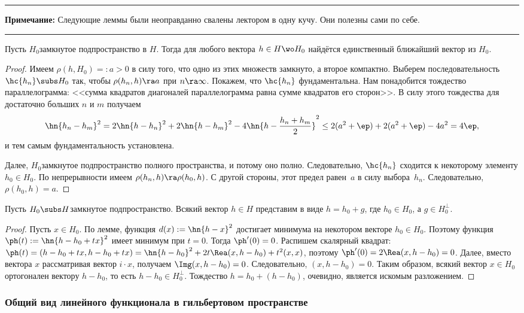 \documentclass[a4paper]{article}
\newcommand{\comment}[1]{\par\vskip2pt\hrule\vskip2pt{\footnotesize \textbf{Примечание:} #1\par}\vskip2pt\hrule\vskip2pt}
\begin{document}
\comment{Следующие леммы были неоправданно свалены лектором в одну кучу. Они полезны сами по себе.}

\begin{lemma}
Пусть $H_0$\т замкнутое подпространство в $H$. Тогда для любого вектора $h \in H \wo H_0$ найдётся единственный
ближайший вектор из $H_0$.
\end{lemma}
\begin{proof}
Имеем $\rho(h, H_0) =: a > 0$ в силу того, что одно из этих множеств замкнуто, а второе компактно.
Выберем последовательность $\hc{h_n} \subs H_0$ так, чтобы $\rho(h_n,h) \ra a$ при $n \ra \infty$.
Покажем, что $\hc{h_n}$ фундаментальна.
Нам понадобится тождество параллелограмма: <<сумма квадратов диагоналей параллелограмма равна
сумме квадратов его сторон>>. В силу этого тождества для достаточно больших $n$ и $m$ получаем
$$\hn{h_n - h_m}^2 = 2\hn{h-h_n}^2 + 2\hn{h-h_m}^2 - 4\hn{h - \frac{h_n+h_m}{2}}^2 \le
2(a^2 + \ep) + 2(a^2 + \ep) - 4a^2 = 4\ep,$$
и тем самым фундаментальность установлена.

Далее, $H_0$\т замкнутое подпространство полного пространства, и потому оно полно.
Следовательно, $\hc{h_n}$ сходится к некоторому элементу $h_0 \in H_0$.
По непрерывности имеем $\rho(h_n,h) \ra \rho(h_0,h)$. С другой стороны, этот предел равен~$a$
в силу выбора~$h_n$. Следовательно, $\rho(h_0,h)=a$.
\end{proof}

\begin{imp}
Пусть $H_0 \subs H$\т замкнутое подпространство.
Всякий вектор $h \in H$ представим в виде $h = h_0 + g$, где $h_0 \in H_0$, а $g \in H_0^\bot$.
\end{imp}
\begin{proof}
Пусть $x \in H_0$. По лемме, функция $d(x) := \hn{h - x}^2$ достигает минимума на
некотором векторе $h_0 \in H_0$. Поэтому функция $\ph(t) := \hn{h - h_0 + tx}^2$
имеет минимум при $t = 0$. Тогда $\ph'(0) = 0$. Распишем скалярный квадрат:
$\ph(t) = (h - h_0 +tx, h-h_0 +tx) = \hn{h-h_0}^2 + 2t\Rea(x,h-h_0) + t^2(x,x)$,
поэтому $\ph'(0) = 2\Rea(x,h -h_0) = 0$. Далее, вместо вектора $x$ рассматривая вектор $i\cdot x$,
получаем $\Img(x,h-h_0) = 0$. Следовательно, $(x,h-h_0) = 0$.
Таким образом, всякий вектор $x \in H_0$ ортогонален вектору $h - h_0$, то есть $h-h_0 \in H_0^\bot$.
Тождество $h = h_0 + (h-h_0)$, очевидно, является искомым разложением.
\end{proof}

\subsubsection{Общий вид линейного функционала в гильбертовом пространстве}
\end{document}
